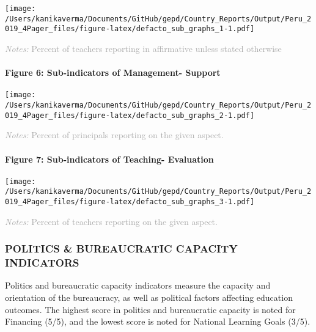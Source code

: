 \documentclass[twocolumn]{article}
\let\oldparagraph\paragraph
\renewcommand{\paragraph}[1]{\oldparagraph{#1}\mbox{}}
\begin{document}
\texttt{[image: /Users/kanikaverma/Documents/GitHub/gepd/Country\_Reports/Output/Peru\_2019\_4Pager\_files/figure-latex/defacto\_sub\_graphs\_1-1.pdf]}

{\scriptsize
    \textcolor{darkgray}{\textit{Notes:} Percent of teachers reporting in affirmative unless stated otherwise}
  }

\hypertarget{figure-6-sub-indicators-of-management--support}{%
\paragraph{Figure 6: Sub-indicators of Management-
Support}\label{figure-6-sub-indicators-of-management--support}}

\texttt{[image: /Users/kanikaverma/Documents/GitHub/gepd/Country\_Reports/Output/Peru\_2019\_4Pager\_files/figure-latex/defacto\_sub\_graphs\_2-1.pdf]}

{\scriptsize
    \textcolor{darkgray}{\textit{Notes:} Percent of principals reporting on the given aspect.}
  }

\hypertarget{figure-7-sub-indicators-of-teaching--evaluation}{%
\paragraph{Figure 7: Sub-indicators of Teaching-
Evaluation}\label{figure-7-sub-indicators-of-teaching--evaluation}}

\texttt{[image: /Users/kanikaverma/Documents/GitHub/gepd/Country\_Reports/Output/Peru\_2019\_4Pager\_files/figure-latex/defacto\_sub\_graphs\_3-1.pdf]}

{\scriptsize
    \textcolor{darkgray}{\textit{Notes:} Percent of teachers reporting on the given aspect.}
  }

\vfill\null

\hypertarget{politics-bureaucratic-capacity-indicators}{%
\subsubsection{\texorpdfstring{\textbf{POLITICS \& BUREAUCRATIC CAPACITY
INDICATORS}}{POLITICS \& BUREAUCRATIC CAPACITY INDICATORS}}\label{politics-bureaucratic-capacity-indicators}}

Politics and bureaucratic capacity indicators measure the capacity and
orientation of the bureaucracy, as well as political factors affecting
education outcomes. The highest score in politics and bureaucratic
capacity is noted for Financing (5/5), and the lowest score is noted for
National Learning Goals (3/5).
\end{document}
